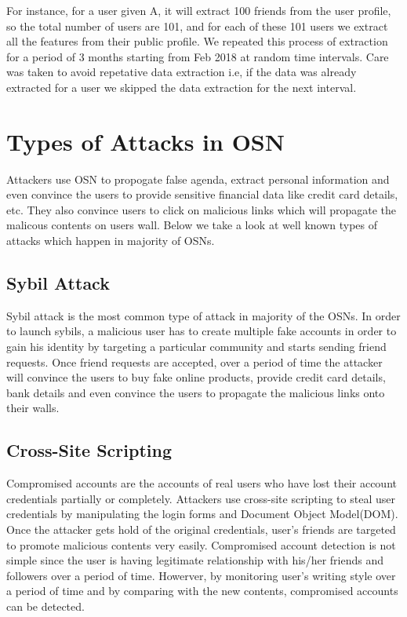 \documentclass[conference]{IEEEtran}
\begin{document}
For instance, for a user given A, it will extract 100 friends from the user profile, so the total number of users are 101, and for each of these 101 users we extract all the features from their public profile. We repeated this process of extraction for a period of 3 months starting from Feb 2018 at random time intervals. Care was taken to avoid repetative data extraction i.e, if the data was already extracted for a user we skipped the data extraction for the next interval.

\section{Types of Attacks in OSN}
Attackers use OSN to propogate false agenda, extract personal information and even convince the users to provide sensitive financial data like credit card details, etc. They also convince users to click on malicious links which will propagate the malicous contents on users wall. Below we take a look at well known types of attacks which happen in majority of OSNs.

\subsection{Sybil Attack}
Sybil attack is the most common type of attack in majority of the OSNs. In order to launch sybils, a malicious user has to create multiple fake accounts in order to gain his identity by targeting a particular community and starts sending friend requests. Once friend requests are accepted, over a period of time the attacker will convince the users to buy fake online products, provide credit card details, bank details and even convince the users to propagate the malicious links onto their walls.

\subsection{Cross-Site Scripting}
Compromised accounts are the accounts of real users who have lost their account credentials partially or completely. Attackers use cross-site scripting to steal user credentials by manipulating the login forms and Document Object Model(DOM). Once the attacker gets hold of the original credentials, user's friends are targeted to promote malicious contents very easily. Compromised account detection is not simple since the user is having legitimate relationship with his/her friends and followers over a period of time. Howerver, by monitoring user's writing style over a period of time and by comparing with the new contents, compromised accounts can be detected.
\end{document}
